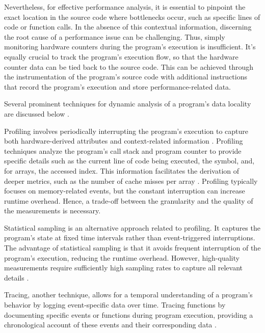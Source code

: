 Nevertheless, for effective performance analysis, it is essential to pinpoint the exact location in the source code where bottlenecks occur, such as specific lines of code or function calls. In the absence of this contextual information, discerning the root cause of a performance issue can be challenging. Thus, simply monitoring hardware counters during the program's execution is insufficient. It's equally crucial to track the program's execution flow, so that the hardware counter data can be tied back to the source code. This can be achieved through the instrumentation of the program's source code with additional instructions that record the program's execution and store performance-related data.

Several prominent techniques for dynamic analysis of a program's data locality are discussed below \cite{shende1999profiling,itzkowitz2003memory,gimenez2017memaxes,mckinley1999quantifying,adhianto2010hpctoolkit}.

Profiling involves periodically interrupting the program's execution to capture both hardware-derived attributes and context-related information \cite{itzkowitz2003memory,gimenez2017memaxes,adhianto2010hpctoolkit}. Profiling techniques analyze the program's call stack and program counter to provide specific details such as the current line of code being executed, the symbol, and, for arrays, the accessed index. This information facilitates the derivation of deeper metrics, such as the number of cache misses per array \cite{adhianto2010hpctoolkit}. Profiling typically focuses on memory-related events, but the constant interruption can increase runtime overhead. Hence, a trade-off between the granularity and the quality of the measurements is necessary.

Statistical sampling is an alternative approach related to profiling. It captures the program's state at fixed time intervals rather than event-triggered interruptions. The advantage of statistical sampling is that it avoids frequent interruption of the program's execution, reducing the runtime overhead. However, high-quality measurements require sufficiently high sampling rates to capture all relevant details \cite{adhianto2010hpctoolkit}.

Tracing, another technique, allows for a temporal understanding of a program's behavior by logging event-specific data over time. Tracing functions by documenting specific events or functions during program execution, providing a chronological account of these events and their corresponding data \cite{shende1999profiling,adhianto2010hpctoolkit,mckinley1999quantifying}.


